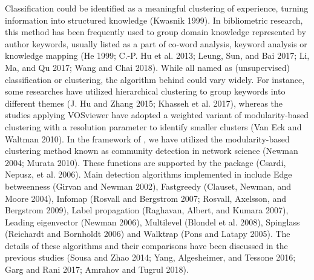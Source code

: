 Classification could be identified as a meaningful clustering of experience, turning information into structured knowledge (Kwasnik 1999). In bibliometric research, this method has been frequently used to group domain knowledge represented by author keywords, usually listed as a part of co-word analysis, keyword analysis or knowledge mapping (He 1999; C.-P. Hu et al. 2013; Leung, Sun, and Bai 2017; Li, Ma, and Qu 2017; Wang and Chai 2018). While all named as (unsupervised) classification or clustering, the algorithm behind could vary widely. For instance, some researches have utilized hierarchical clustering to group keywords into different themes (J. Hu and Zhang 2015; Khasseh et al. 2017), whereas the studies applying VOSviewer have adopted a weighted variant of modularity-based clustering with a resolution parameter to identify smaller clusters (Van Eck and Waltman 2010). In the framework of , we have utilized the modularity-based clustering method known as community detection in network science (Newman 2004; Murata 2010). These functions are supported by the  package (Csardi, Nepusz, et al. 2006). Main detection algorithms implemented in  include Edge betweenness (Girvan and Newman 2002), Fastgreedy (Clauset, Newman, and Moore 2004), Infomap (Rosvall and Bergstrom 2007; Rosvall, Axelsson, and Bergstrom 2009), Label propagation (Raghavan, Albert, and Kumara 2007), Leading eigenvector (Newman 2006), Multilevel (Blondel et al. 2008), Spinglass (Reichardt and Bornholdt 2006) and Walktrap (Pons and Latapy 2005). The details of these algorithms and their comparisons have been discussed in the previous studies (Sousa and Zhao 2014; Yang, Algesheimer, and Tessone 2016; Garg and Rani 2017; Amrahov and Tugrul 2018).

